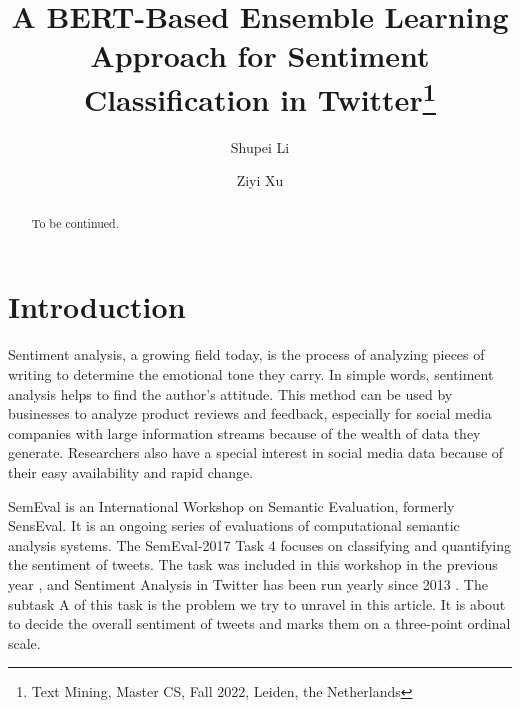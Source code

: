 \documentclass[runningheads]{llncs}
\begin{document}
%
\title{A BERT-Based Ensemble Learning Approach for Sentiment Classification in Twitter\thanks{Text Mining, Master CS, Fall 2022, Leiden, the Netherlands}}
%
%
\author{Shupei Li\and
Ziyi Xu}
%
%
%
\maketitle              %
%
\begin{abstract}
To be continued.

\end{abstract}
%
%
%
\section{Introduction}
Sentiment analysis, a growing field today, is the process of analyzing pieces of writing to determine the emotional tone they carry. In simple words, sentiment analysis helps to find the author's attitude. This method can be used by businesses to analyze product reviews and feedback, especially for social media companies with large information streams because of the wealth of data they generate. Researchers also have a special interest in social media data because of their easy availability and rapid change.

SemEval is an International Workshop on Semantic Evaluation, formerly SensEval. It is an ongoing series of evaluations of computational semantic analysis systems. The SemEval-2017 Task 4 focuses on classifying and quantifying the sentiment of tweets. The task was included in this workshop in the previous year \cite{nakov-etal-2016-semeval}, and Sentiment Analysis in Twitter has been run yearly since 2013 \cite{nakov-etal-2013-semeval}. The subtask A of this task is the problem we try to unravel in this article. It is about to decide the overall sentiment of tweets and marks them on a three-point ordinal scale.%
\end{document}
